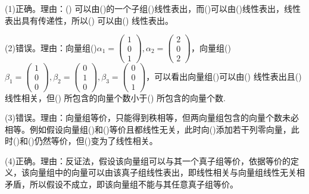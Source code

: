 \documentclass[a4paper]{report}
\begin{document}
\begin{jie}
(1)正确。理由：(\uppercase\expandafter{}) 可以由(\uppercase\expandafter{})的一个子组(\uppercase\expandafter{})线性表出，而(\uppercase\expandafter{})可以由(\uppercase\expandafter{})线性表出，线性表出具有传递性，所以(\uppercase\expandafter{}) 可以由(\uppercase\expandafter{}) 线性表出。

(2)错误。理由：向量组(\uppercase\expandafter{})$\alpha_1=
\begin{pmatrix}
1\\ 0\\ 1
\end{pmatrix}
,\alpha_2=
\begin{pmatrix}
2\\ 0 \\2
\end{pmatrix}$，向量组(\uppercase\expandafter{})$\beta_1=
\begin{pmatrix}
1\\ 0\\ 0
\end{pmatrix}
,\beta_2=
\begin{pmatrix}
0\\ 1 \\0
\end{pmatrix},\beta_3=
\begin{pmatrix}
0\\ 0 \\1
\end{pmatrix}$，可以看出向量组(\uppercase\expandafter{})可以由(\uppercase\expandafter{}) 线性表出且(\uppercase\expandafter{}) 线性相关，但(\uppercase\expandafter{}) 所包含的向量个数小于(\uppercase\expandafter{}) 所包含的向量个数.

(3)错误。理由：向量组等价，只能得到秩相等，但两向量组包含的向量个数未必相等。例如假设向量组(\uppercase\expandafter{})和(\uppercase\expandafter{})等价且都线性无关，此时向(\uppercase\expandafter{})添加若干列零向量，此时(\uppercase\expandafter{})和(\uppercase\expandafter{})仍然等价，但(\uppercase\expandafter{})变为了线性相关。

(4)正确。理由：反证法，假设该向量组可以与其一个真子组等价，依据等价的定义，该向量组中的向量可以由该真子组线性表出，即线性相关与向量组线性无关相矛盾，所以假设不成立，即该向量组不能与其任意真子组等价。


\end{jie}
\end{document}
